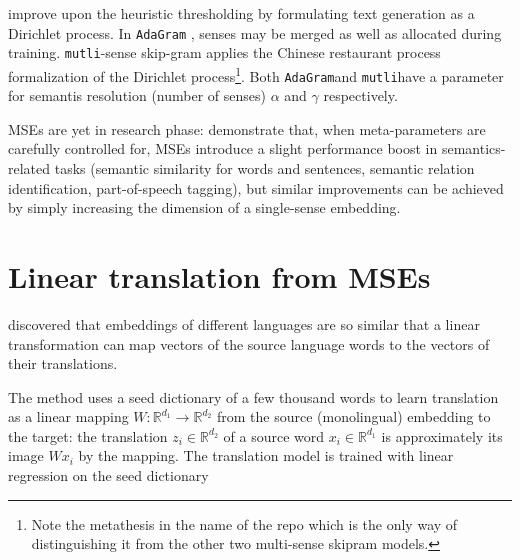 \documentclass[11pt]{article}
\newcommand{\adagram}{\texttt{AdaGram}}
\newcommand{\mutli}{\texttt{mutli}}
\newcommand{\Ro}{\mathbb{R}^{d_1}}
\newcommand{\Rt}{\mathbb{R}^{d_2}}
\begin{document}


\cite{Bartunov:2015,Li:2015} improve upon the heuristic thresholding by
formulating text generation as a Dirichlet process. In \adagram
\citep{Bartunov:2015}, senses may be merged as well as allocated during
training. \mutli-sense skip-gram \citep{Li:2015} applies the Chinese restaurant
process formalization of the Dirichlet process\footnote{Note the metathesis in
the name of the repo which is the only way of distinguishing it from the other
two multi-sense skipram models.}. Both \adagram and \mutli have a parameter for
semantis resolution (number of senses) $\alpha$ and $\gamma$ respectively. 


MSEs are yet in
research phase: \cite{Li:2015}  demonstrate that, when meta-parameters are
carefully controlled for, MSEs introduce a slight performance boost in
semantics-related tasks (semantic similarity for words and sentences, semantic
relation identification, part-of-speech tagging), but similar improvements can
be achieved by simply increasing the dimension of a single-sense embedding.

\section{Linear translation from MSEs}

 \cite{Mikolov:2013x} discovered that embeddings of different languages are so
 similar that a linear transformation can map vectors of the source language
 words to the vectors of their translations.

The method uses a seed dictionary of a few thousand words to learn translation
as a linear mapping $W: \mathbb{R}^{d_1}\rightarrow \mathbb{R}^{d_2}$ from the
source (monolingual) embedding to the target: the translation $z_i \in \Rt$ of
a source word $x_i \in \Ro$ is approximately its image $Wx_i$ by the mapping.
The translation model is trained with linear regression on the seed dictionary
\end{document}
